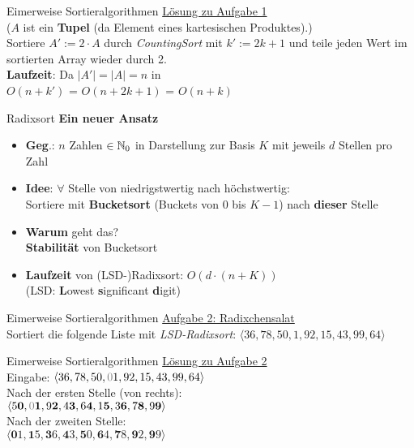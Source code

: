 \begin{frame}{Eimerweise Sortieralgorithmen}
	\underline{Lösung zu Aufgabe 1} \\
	($A$ ist ein \textbf{Tupel} (da Element eines kartesischen Produktes).) \\
	Sortiere $A' := 2 \cdot A$ durch \emph{CountingSort} mit $k' := 2k+1$ und teile jeden Wert im sortierten Array wieder durch 2. \\
	\textbf{Laufzeit}: Da $|A'| = |A| = n$ in \\ 
	$O(n + k')$ = $O(n + 2k+1)$ = $O(n + k)$ 
\end{frame}

\begin{frame}{Radixsort}
	\textbf{Ein neuer Ansatz} \\
	\begin{itemize}
		\item \textbf{Geg}.: $n$ Zahlen $\in \mathbb{N}_0$  in Darstellung zur Basis $K$ mit jeweils $d$ Stellen pro Zahl 
		\pause
		\item \textbf{Idee}: $\forall $ Stelle von niedrigstwertig nach höchstwertig: \\ Sortiere mit \textbf{Bucketsort} (Buckets von $0$ bis $K-1$) nach \textbf{dieser} Stelle
		\pause
		\item \textbf{Warum} geht das? \\
		\pause 
		\impl \textbf{Stabilität} von Bucketsort
		\item \textbf{Laufzeit} von (LSD-)Radixsort: $O(d \cdot (n + K))$ \\
		{\small (LSD: \textbf{L}owest \textbf{s}ignificant \textbf{d}igit)}
	\end{itemize}
\end{frame}

\begin{frame}{Eimerweise Sortieralgorithmen}
	\underline{Aufgabe 2: Radixchensalat} \\
	Sortiert die folgende Liste mit \emph{LSD-Radixsort}:  $\langle 36, 78, 50, 1, 92, 15, 43, 99, 64 \rangle$
\end{frame}

\begin{frame}{Eimerweise Sortieralgorithmen}
	\underline{Lösung zu Aufgabe 2} \\[0,25cm]
	Eingabe:  $\langle 36, 78, 50, \gray{0}1, 92, 15, 43, 99, 64 \rangle$
	\\[0,25cm]
	Nach der ersten Stelle (von rechts): \\ $\langle 5\textbf{0}, \gray{0}\textbf{1}, 9\textbf{2}, 4\textbf{3}, 6\textbf{4}, 1\textbf{5}, 3\textbf{6}, 7\textbf{8}, 9\textbf{9} \rangle$
	\\[0,25cm]
	Nach der zweiten Stelle: \\ $\langle \textbf{0}1, \textbf{1}5, \textbf{3}6, \textbf{4}3, \textbf{5}0, \textbf{6}4, \textbf{7}8, \textbf{9}2, \textbf{9}9 \rangle$
\end{frame}

